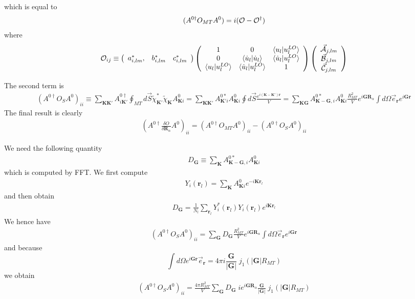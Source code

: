\documentclass[aps,prb,floatfix,epsfig,singlecolumn,showpacs,preprintnumbers]{revtex4}
\newcommand{\vR}{{\mathbf{R}}}
\renewcommand{\vr}{{\mathbf{r}}}
\newcommand{\vK}{{\mathbf{K}}}
\newcommand{\vG}{{\mathbf{G}}}
\newcommand{\cO}{{\cal O}}
\newcommand{\vcA}{\vec{\cal A}}
\newcommand{\vcB}{\vec{\cal B}}
\newcommand{\vcC}{\vec{\cal C}}
\begin{document}
which is equal to
\begin{eqnarray}
(A^{0\dagger} O_{MT} A^0) = i (\cO-\cO^\dagger)
\end{eqnarray}
where
\begin{eqnarray}
\cO_{ij} \equiv \left(
\begin{array}{ccc}
a_{i,lm}^*, & b_{i,lm}^* & c^*_{i,lm}
\end{array}
\right)
\left(
\begin{array}{ccc}
1 & 0 & \braket{u_l|u^{LO}_l} \\
0 & \braket{\dot{u}_l|\dot{u}_l} & \braket{\dot{u}_l|u^{LO}_l} \\
\braket{u_l|u^{LO}_l} & \braket{\dot{u}_l|u^{LO}_l} & 1 
\end{array}
\right)
\left(
\begin{array}{c}
\vcA_{j,lm}\\
\vcB_{j,lm}\\ 
\vcC_{j,lm}
\end{array}
\right) 
\end{eqnarray}


The second term is
\begin{eqnarray}
(A^{0\dagger} O_S A^0)_{ii} \equiv \sum_{\vK\vK'}A^{0\dagger}_{i\vK'}\oint_{MT} d\vec{S} \tilde{\chi}_{\vK'}^* \tilde{\chi}_{\vK}A^0_{\vK i}=
\sum_{\vK\vK'}A^{0*}_{\vK' i} A^0_{\vK i}\oint  d\vec{S}\frac{e^{i(\vK-\vK')\vr}}{V}=
\sum_{\vK\vG}A^{0*}_{\vK-\vG, i} A^0_{\vK  i} 
\frac{R_{MT}^2}{V} e^{i\vG\vR_\alpha}\int d\Omega\vec{e}_\vr  {e^{i\vG\vr}}
\nonumber
\end{eqnarray}
The final result is clearly
\begin{eqnarray}
(A^{0\dagger}\frac{\delta O}{\delta \vR_\alpha}  A^0)_{ii}=(A^{0\dagger} O_{MT} A^0)_{ii}-(A^{0\dagger} O_S A^0)_{ii} 
\end{eqnarray}

We need the following quantity
\begin{eqnarray}
D_\vG\equiv \sum_{\vK}A^{0*}_{\vK-\vG, i}A^0_{\vK  i} 
\end{eqnarray}
which is computed by FFT. We first compute
\begin{eqnarray}
Y_i(\vr_l)= \sum_\vK A^0_{\vK  i} e^{-i\vK\vr_l}
\end{eqnarray}
and then obtain
\begin{eqnarray}
D_\vG = \frac{1}{N_l}\sum_{\vr_l} Y^*_i(\vr_l) Y_i(\vr_l) e^{i\vK\vr_l}
\end{eqnarray}
We hence have
\begin{eqnarray}
(A^{0\dagger} O_S A^0)_{ii} =
\sum_{\vG} D_\vG
\frac{R_{MT}^2}{V} e^{i\vG\vR_\alpha}\int d\Omega\vec{e}_\vr  {e^{i\vG\vr}}
\end{eqnarray}
and because
\begin{equation}
\int d\Omega e^{i\vG\vr} \vec{e}_\vr={4\pi i } \frac{\vG}{|\vG|}\;j_1(|\vG|R_{MT})
\end{equation}
we obtain
\begin{eqnarray}
(A^{0\dagger} O_S A^0)_{ii} =
\frac{4\pi R_{MT}^2}{V} 
\sum_{\vG} D_\vG\;
i e^{i\vG\vR_\alpha}\frac{\vG}{|\vG|}\;j_1(|\vG|R_{MT})
\end{eqnarray}
\end{document}
